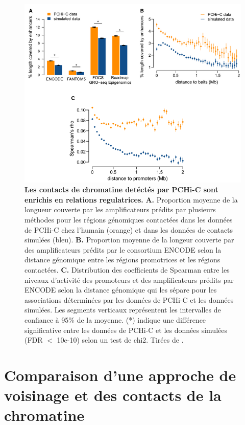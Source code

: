 \begin{figure}[H]
    \centering
    \includegraphics[width=1\textwidth, page=1]{figures/chap2/chap2-fig4.png}
    \caption[Les contacts de chromatine detéctés par \gls{PCHi-C} sont enrichis en relations regulatrices.]{
    \textbf{Les contacts de chromatine detéctés par \gls{PCHi-C} sont enrichis en relations regulatrices.}
    \textbf{A.} Proportion moyenne de la longueur couverte par les amplificateurs prédits par plusieurs méthodes pour les régions génomiques contactées dans les données de \gls{PCHi-C} chez l'humain (orange) et dans les données de contacts simulées (bleu). 
    \textbf{B.} Proportion moyenne de la longeur couverte par des amplificateurs prédits par le consortium ENCODE selon la distance génomique entre les régions promotrices et les régions contactées. 
    \textbf{C.} Distribution des coefficients de Spearman entre les niveaux d'activité des promoteurs et des amplificateurs prédits par ENCODE selon la distance génomique qui les sépare pour les associations déterminées par les données de \gls{PCHi-C} et les données simulées. Les segments verticaux représentent les intervalles de confiance à 95\% de la moyenne. (*) indique une différence significative entre les données de \gls{PCHi-C} et les données simulées (FDR $<$ 10e-10) selon un test de chi2.
    Tirées de \citep{laverre_long-range_2022}.
    }
    \label{fig:chap2-fig4}
\end{figure} 

\section{Comparaison d’une approche de voisinage et des contacts de la chromatine}
\label{sec:comp-voisinage-contact}

